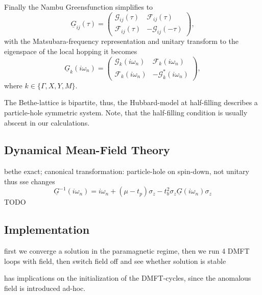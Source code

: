 \documentclass[aps,prb,twocolumn,groupedaddress,amsmath,amssymb]{revtex4-1}
\newcommand{\nambu}[1]{\mathcal{#1}}
\newcommand{\Nambu}[1]{\underline{#1}}
\begin{document}
Finally the Nambu Greensfunction simplifies to
\begin{equation}
  \label{eq:nambugftausimple}
    \Nambu{G}_{ij}(\tau)=\begin{pmatrix}\nambu{G}_{ij}(\tau)&\nambu{F}_{ij}(\tau)\\\nambu{F}_{ij}(\tau)&-\nambu{G}_{ij}(-\tau)\end{pmatrix},
 \end{equation}
with the Matsubara-frequency representation and unitary transform to the eigenspace of the local hopping it becomes
\begin{equation}
  \label{eq:nambugffreqsimple}
    \Nambu{G}_{k}(i\omega_n)=\begin{pmatrix}\nambu{G}_{k}(i\omega_n)&\nambu{F}_{k}(i\omega_n)\\\nambu{F}_{k}(i\omega_n)&-\nambu{G}_{k}^\ast(i\omega_n)\end{pmatrix},
 \end{equation}
where $k\in \{\Gamma,X,Y,M\}$.

The Bethe-lattice is bipartite, thus, the Hubbard-model at half-filling describes a particle-hole symmetric system. Note, that the half-filling condition is usually abscent in our calculations.

\subsection{Dynamical Mean-Field Theory}
bethe exact;
canonical transformation: particle-hole on spin-down, not unitary thus sse changes
\begin{equation}
  \label{eq:selfconsistency}
  \Nambu{G}^{-1}(i\omega_n)=i\omega_n+(\mu-t_{p})\sigma_z-t_{b}^2\sigma_z\Nambu{G}(i\omega_n)\sigma_z
\end{equation}
TODO\cite{Hafermann2009}\cite{Moeller1999}

\subsection{Implementation}
first we converge a solution in the paramagnetic regime, then we run 4 DMFT loops with field, then switch field off and see whether solution is stable

has implications on the initialization of the DMFT-cycles, since the anomalous field is introduced ad-hoc.
\end{document}
